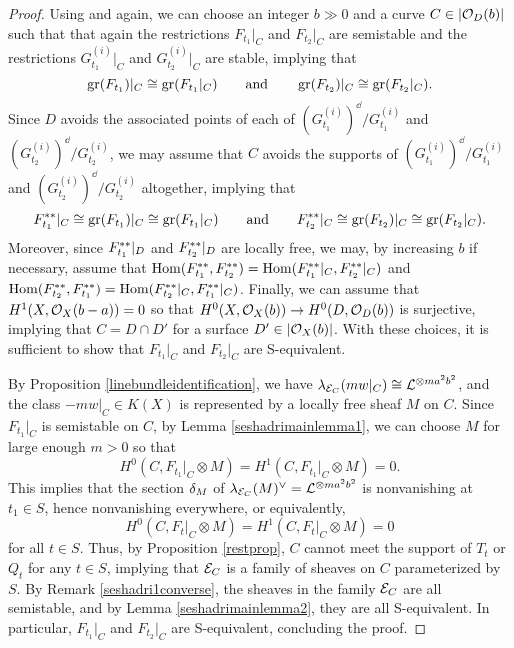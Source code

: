 \begin{proof}
Using \cite[Theorem 7.1.1]{HL} and \cite[Theorem 7.2.8]{HL} again, we can choose an integer $b \gg 0$ and a curve $C \in |\mathcal{O}_D(b)|$ such that that again the restrictions $F_{t_1}|_C$ and $F_{t_2}|_C$ are semistable and the restrictions $G_{t_1}^{(i)}|_C$ and $G_{t_2}^{(i)}|_C$ are stable, implying that 
\[ \operatorname{\mathrm{gr}}(F_{t_1})|_C \cong \operatorname{\mathrm{gr}}(F_{t_1}|_C) \qquad \text{and} \qquad \operatorname{\mathrm{gr}}(F_{t_2})|_C \cong \operatorname{\mathrm{gr}}(F_{t_2}|_C). \]
Since $D$ avoids the associated points of each of $(G_{t_1}^{(i)})^\dd/G_{t_1}^{(i)}$ and $(G_{t_2}^{(i)})^\dd/G_{t_2}^{(i)}$, we may assume that $C$ avoids the supports of $(G_{t_1}^{(i)})^\dd/G_{t_1}^{(i)}$ and $(G_{t_2}^{(i)})^\dd/G_{t_2}^{(i)}$ altogether, implying that
\[ F_{t_1}^{\ast\ast}|_C \cong \operatorname{\mathrm{gr}}(F_{t_1})|_C \cong \operatorname{\mathrm{gr}}(F_{t_1}|_C) \qquad \text{and} \qquad F_{t_2}^{\ast\ast}|_C \cong \operatorname{\mathrm{gr}}(F_{t_2})|_C \cong \operatorname{\mathrm{gr}}(F_{t_2}|_C). \]
Moreover, since $F_{t_1}^{\ast\ast}|_D$ and $F_{t_2}^{\ast\ast}|_D$ are locally free, we may, by increasing $b$ if necessary, assume that $\mathrm{Hom}(F_{t_1}^{\ast\ast}, F_{t_2}^{\ast\ast}) = \mathrm{Hom}(F_{t_1}^{\ast\ast}|_C, F_{t_2}^{\ast\ast}|_C)$ and $\mathrm{Hom}(F_{t_2}^{\ast\ast}, F_{t_1}^{\ast\ast}) = \mathrm{Hom}(F_{t_2}^{\ast\ast}|_C, F_{t_1}^{\ast\ast}|_C)$. Finally, we can assume that $H^1(X, \mathcal{O}_X(b-a)) = 0$ so that $H^0(X, \mathcal{O}_X(b)) \to H^0(D, \mathcal{O}_D(b))$ is surjective, implying that $C = D \cap D'$ for a surface $D' \in |\mathcal{O}_X(b)|$. With these choices, it is sufficient to show that $F_{t_1}|_C$ and $F_{t_2}|_C$ are S-equivalent. 

By Proposition \ref{linebundleidentification}, we have $\lambda_{\mathcal{E}_C}(m w|_C) \cong \mathcal{L}^{\otimes m a^2 b^2}$, and the class $- m w|_C \in K(X)$ is represented by a locally free sheaf $M$ on $C$. Since $F_{t_1}|_C$ is semistable on $C$, by Lemma \ref{seshadrimainlemma1}, we can choose $M$ for large enough $m > 0$ so that
\[ H^0(C, F_{t_1}|_C \otimes M) = H^1(C, F_{t_1}|_C \otimes M) = 0. \]
This implies that the section $\delta_M$ of $\lambda_{\mathcal{E}_C}(M)^\vee = \mathcal{L}^{\otimes m a^2 b^2}$ is nonvanishing at $t_1 \in S$, hence nonvanishing everywhere, or equivalently,
\[ H^0(C, F_t|_C \otimes M) = H^1(C, F_t|_C \otimes M) = 0 \]
for all $t \in S$. Thus, by Proposition \ref{restprop}, $C$ cannot meet the support of $T_t$ or $Q_t$ for any $t \in S$, implying that $\mathcal{E}_C$ is a family of sheaves on $C$ parameterized by $S$. By Remark \ref{seshadri1converse}, the sheaves in the family $\mathcal{E}_C$ are all semistable, and by Lemma \ref{seshadrimainlemma2}, they are all S-equivalent. In particular, $F_{t_1}|_C$ and $F_{t_2}|_C$ are S-equivalent, concluding the proof.
\end{proof}

